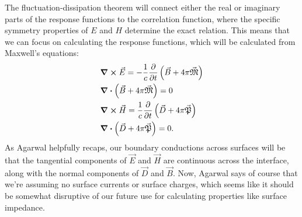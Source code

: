 \documentclass[../main.tex]{subfiles}
\newcommand{\polr}{\vec{\mathfrak{P}}}
\newcommand{\magn}{\vec{\mathfrak{M}}}
\begin{document}
	The fluctuation-dissipation theorem will connect either the real or imaginary parts of the response functions to the correlation function, where the specific symmetry properties of $E$ and $H$ determine the exact relation.
	This means that we can focus on calculating the response functions, which will be calculated from Maxwell's equations:
	\begin{align}
		&\curl{\vec{E}} = - \frac{1}{c} \pdv{t} \left( \vec{B} + 4 \pi \magn \right) \\
		&\div( \vec{B} + 4 \pi \magn) = 0 \\
		&\curl{\vec{H}} = \frac{1}{c} \pdv{t} \left( \vec{D} + 4 \pi \polr \right) \\
		&\div(\vec{D} + 4 \pi \polr) = 0.
	\end{align}
	As Agarwal helpfully recaps, our boundary conductions across surfaces will be that the tangential components of $\vec{E}$ and $\vec{H}$ are continuous across the interface, along with the normal components of $\vec{D}$ and $\vec{B}$.
	Now, Agarwal says of course that we're assuming no surface currents or surface charges, which seems like it should be somewhat disruptive of our future use for calculating properties like surface impedance.
\end{document}
